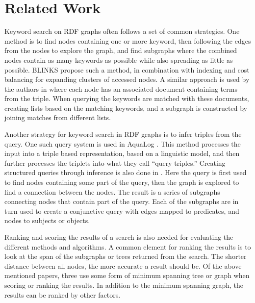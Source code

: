 \chapter{Related Work}
\label{cha:related_work}
Keyword search on RDF graphs often follows a set of common strategies. One method is to find nodes containing one or more keyword, then following the edges from the nodes to explore the graph, and find subgraphs where the combined nodes contain as many keywords as possible while also spreading as little as possible. BLINKS \citep{blinks} propose such a method, in combination with indexing and cost balancing for expanding clusters of accessed nodes. A similar approach is used by the authors in \citep{Elbassuoni:2011:KSO:2063576.2063615} where each node has an associated document containing terms from the triple. When querying the keywords are matched with these documents, creating lists based on the matching keywords, and a subgraph is constructed by joining matches from different lists.

Another strategy for keyword search in RDF graphs is to infer triples from the query. One such query system is used in AquaLog \citep{aqualog}. This method processes the input into a triple based representation, based on a linguistic model, and then further processes the triplets into what they call ``query triples.'' Creating structured queries through inference is also done in \citep{4812421}. Here the query is first used to find nodes containing some part of the query, then the graph is explored to find a connection between the nodes. The result is a series of subgraphs connecting nodes that contain part of the query. Each of the subgraphs are in turn used to create a conjunctive query with edges mapped to predicates, and nodes to subjects or objects.

Ranking and scoring the results of a search is also needed for evaluating the different methods and algorithms. A common element for ranking the results is to look at the span of the subgraphs or trees returned from the search. The shorter distance between all nodes, the more accurate a result should be. Of the above mentioned papers, three \citep{blinks, Elbassuoni:2011:KSO:2063576.2063615, 4812421} use some form of minimum spanning tree or graph when scoring or ranking the results. In addition to the minimum spanning graph, the results can be ranked by other factors. 

